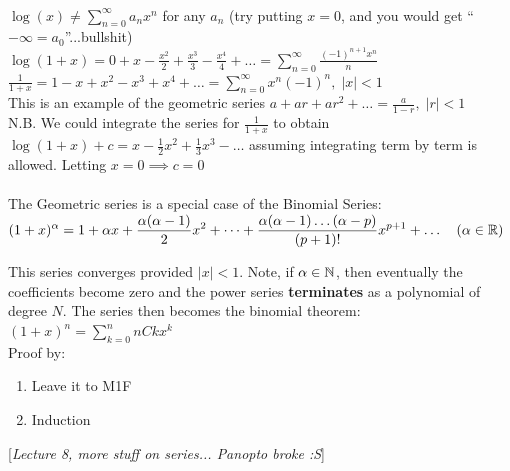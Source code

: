 \\

$\log(x) \neq \displaystyle{\sum_{n=0}^{\infty} a_n x^n}$ for any $a_n$ (try putting $x=0$, and you would get ``$-\infty = a_0$''...bullshit)\\

$\displaystyle{\log(1+x) = 0 + x - \frac{x^2}{2} + \frac{x^3}{3} - \frac{x^4}{4} + \dots = \sum_{n=0}^{\infty} \frac{(-1)^{n+1}x^n}{n} }$\\

$\displaystyle{\frac{1}{1+x} = 1 - x + x^2 - x^3 + x^4 + \dots = \sum_{n=0}^{\infty} x^n(-1)^n, \; |x| < 1 }$\\
This is an example of the geometric series $a + ar + ar^2 + \dots = \frac{a}{1-r}, \; |r|<1$\\

N.B. We could integrate the series for $\frac{1}{1+x}$ to obtain $\log(1+x) + c = x - \frac{1}{2}x^2 + \frac{1}{3}x^3 - \dots$ assuming integrating term by term is allowed. Letting $x = 0 \implies c = 0$\\\\

The Geometric series is a special case of the Binomial Series:\\

$\displaystyle{(1+x)^{\alpha} = 1 + \alpha x + \frac{\alpha(\alpha -1)}{2}x^2 + \dots + \frac{\alpha(\alpha-1)\dots(\alpha-p)}{(p+1)!}x^{p+1} + \dots \quad (\alpha \in \ensuremath{\mathbb{R}}) }$

This series converges provided $|x|<1$. Note, if $\alpha \in \mathbb{N}$, then eventually the coefficients become zero and the power series \textbf{terminates} as a polynomial of degree $N$. The series then becomes the binomial theorem: $(1+x)^n = \sum_{k=0}^{n} nCk x^k$\\

Proof by: 
\begin{enumerate}
\item Leave it to M1F
\item Induction
\end{enumerate}

\vspace*{\fill}
\hfill
\begin{center}
[\textit{Lecture 8, more stuff on series... Panopto broke :S}]
\end{center}
\vspace{\fill}
\newpage

